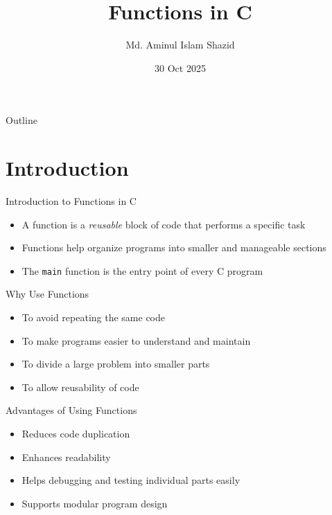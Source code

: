 \documentclass[12pt, aspectratio=169]{beamer}
\title{Functions in C}
\author{Md. Aminul Islam Shazid}
\date{30 Oct 2025}
\begin{document}
    {
		\addtocounter{framenumber}{-2}    %

		\begin{frame}
			\titlepage
		\end{frame}

		\begin{frame}{Outline}
            \vfill
            \small
			\tableofcontents[subsectionstyle=hide]
            \vfill
		\end{frame}
	}

    \section{Introduction}

    \begin{frame}{Introduction to Functions in C}
        \begin{itemize}
            \item A function is a \emph{reusable} block of code that performs a specific task
            \item Functions help organize programs into smaller and manageable sections
            \item The \texttt{main} function is the entry point of every C program
        \end{itemize}
    \end{frame}


    \begin{frame}{Why Use Functions}
        \begin{itemize}
            \item To avoid repeating the same code
            \item To make programs easier to understand and maintain
            \item To divide a large problem into smaller parts
            \item To allow reusability of code
        \end{itemize}
    \end{frame}


    \begin{frame}{Advantages of Using Functions}
        \begin{itemize}
            \item Reduces code duplication
            \item Enhances readability
            \item Helps debugging and testing individual parts easily
            \item Supports modular program design
        \end{itemize}
    \end{frame}
\end{document}
